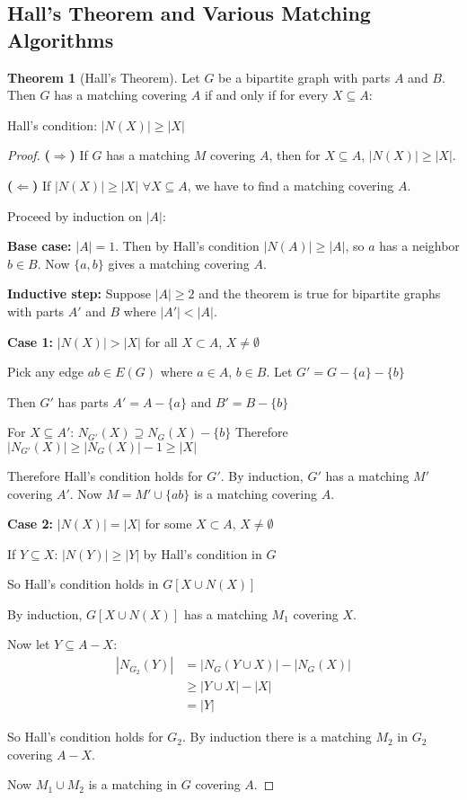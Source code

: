 \documentclass{article}
\theoremstyle{definition}
\newtheorem{theorem}{Theorem}
\begin{document}
\subsection{Hall's Theorem and Various Matching Algorithms}
\begin{theorem}[Hall's Theorem]
Let $G$ be a bipartite graph with parts $A$ and $B$. Then $G$ has a matching covering $A$ if and only if for every $X \subseteq A$:

Hall's condition: $|N(X)| \geq |X|$
\end{theorem}


\begin{proof}
\textbf{($\Rightarrow$)} If $G$ has a matching $M$ covering $A$, then for $X \subseteq A$, $|N(X)| \geq |X|$.

\textbf{($\Leftarrow$)} If $|N(X)| \geq |X|$ $\forall X \subseteq A$, we have to find a matching covering $A$.

Proceed by induction on $|A|$:

\textbf{Base case:} $|A| = 1$. Then by Hall's condition $|N(A)| \geq |A|$, so $a$ has a neighbor $b \in B$. Now $\{a,b\}$ gives a matching covering $A$.

\textbf{Inductive step:} Suppose $|A| \geq 2$ and the theorem is true for bipartite graphs with parts $A'$ and $B$ where $|A'| < |A|$.

\textbf{Case 1:} $|N(X)| > |X|$ for all $X \subset A$, $X \neq \emptyset$

Pick any edge $ab \in E(G)$ where $a \in A$, $b \in B$.
Let $G' = G - \{a\} - \{b\}$

Then $G'$ has parts $A' = A - \{a\}$ and $B' = B - \{b\}$

For $X \subseteq A'$: $N_{G'}(X) \supseteq N_G(X) - \{b\}$
Therefore $|N_{G'}(X)| \geq |N_G(X)| - 1 \geq |X|$

Therefore Hall's condition holds for $G'$.
By induction, $G'$ has a matching $M'$ covering $A'$.
Now $M = M' \cup \{ab\}$ is a matching covering $A$.

\textbf{Case 2:} $|N(X)| = |X|$ for some $X \subset A$, $X \neq \emptyset$

If $Y \subseteq X$:
$|N(Y)| \geq |Y|$ by Hall's condition in $G$

So Hall's condition holds in $G[X\cup N(X)]$

By induction, $G[X\cup N(X)]$ has a matching $M_1$ covering $X$.

Now let $Y \subseteq A-X$:
\begin{align*}
|N_{G_2}(Y)| &= |N_G(Y\cup X)| - |N_G(X)| \\
&\geq |Y\cup X| - |X| \\
&= |Y|
\end{align*}

So Hall's condition holds for $G_2$. By induction there is a matching $M_2$ in $G_2$ covering $A-X$.

Now $M_1\cup M_2$ is a matching in $G$ covering $A$.
\end{proof}
\end{document}
